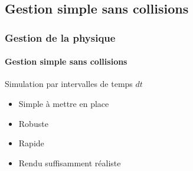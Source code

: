 \documentclass[xcolor=x11names,compress,11pt]{beamer}
\renewcommand{\(}{\begin{columns}}
\renewcommand{\)}{\end{columns}}
\newcommand{\<}[1]{\begin{column}{#1}}
\renewcommand{\>}{\end{column}}
\begin{document}
\subsection*{Gestion simple sans collisions}
\begin{frame}
\frametitle{Gestion de la physique}
\framesubtitle{Gestion simple sans collisions}

Simulation par intervalles de temps $dt$
\begin{itemize}
\item Simple à mettre en place
\item Robuste
\item Rapide
\item Rendu suffisamment réaliste
\end{itemize}

\end{frame}
\end{document}
